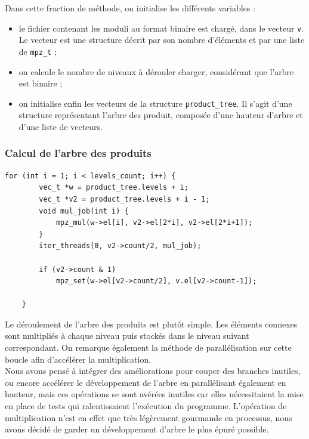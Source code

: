 Dans cette fraction de méthode, on initialise les différents variables :
\begin{itemize}
	\item le fichier contenant les moduli au format binaire est chargé, dans le vecteur \texttt{v}. Le vecteur est une structure décrit par son nombre d'éléments et par une liste de \texttt{mpz\_t} ;
	\item on calcule le nombre de niveaux à dérouler charger, considérant que l'arbre est binaire ;
	\item on initialise enfin les vecteurs de la structure \texttt{product\_tree}. Il s'agit d'une structure représentant  l'arbre des produit, composée d'une hauteur d'arbre et d'une liste de vecteurs.
\end{itemize}



\subsubsection{Calcul de l'arbre des produits}

\begin{lstlisting}[style=customc,caption=fact\_superspeed.c - partie 2, label=fact2]
	for (int i = 1; i < levels_count; i++) {
		vec_t *w = product_tree.levels + i;
		vec_t *v2 = product_tree.levels + i - 1;
		void mul_job(int i) {
			mpz_mul(w->el[i], v2->el[2*i], v2->el[2*i+1]);
		}
		iter_threads(0, v2->count/2, mul_job);

		if (v2->count & 1)
			mpz_set(w->el[v2->count/2], v.el[v2->count-1]); 

	}
\end{lstlisting}

Le déroulement de l'arbre des produits est plutôt simple. Les éléments connexes sont multipliés à chaque niveau puis stockés dans le niveau suivant correspondant. On remarque également la méthode de parallélisation sur cette boucle afin d'accélérer la multiplication.\\

Nous avons pensé à intégrer des améliorations pour couper des branches inutiles, ou encore accélérer le développement de l'arbre en parallélisant également en hauteur, mais ces opérations se sont avérées inutiles car elles nécessitaient la mise en place de tests qui ralentissaient l'exécution du programme. L'opération de multiplication n'est en effet que très légèrement gourmande en processus, nous avons décidé de garder un développement d'arbre le plus épuré possible.\\





